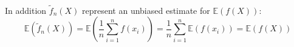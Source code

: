 \\In addition $\widetilde{f}_{n}(X)$ represent an unbiased estimate for $\mathbb{E}(f(X))$:
\begin{equation}
\mathbb{E}(\widetilde{f}_{n}(X)) = \mathbb{E} \left ( \frac{1}{n} \sum_{i=1}^{n} f(x_{i})   \right ) = 
\frac{1}{n} \sum_{i=1}^{n} \mathbb{E}(f(x_{i})) =   \mathbb{E}(f(X)) 
\end{equation}
